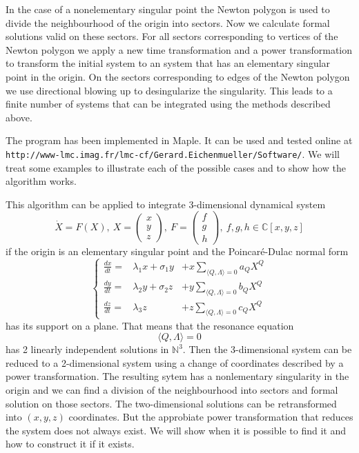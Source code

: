 \documentclass[11p,a4paper]{article}
\newcommand{\N}{{\mathbb N}}
\newcommand{\C}{{\mathbb C}}
\begin{document}
In the case of a nonelementary singular point the Newton polygon is used to
divide the neighbourhood of the origin into sectors. Now we calculate formal
solutions valid on these sectors. For all sectors corresponding to 
vertices of the Newton polygon we apply a new time transformation and a 
power transformation to transform the initial system to an system that 
has an elementary singular point in the origin. On the sectors 
corresponding to edges of the Newton polygon we use 
directional blowing up to desingularize the singularity. This  
leads to a finite number of systems that can be integrated using the 
methods described above. 

The program has been implemented in Maple. It can be used and tested online at
{\tt http://www-lmc.imag.fr/lmc-cf/Gerard.Eichenmueller/Software/}. 
We will treat some examples to illustrate each of the possible cases and 
to show how the algorithm works.

This algorithm can be applied to integrate 3-dimensional dynamical 
system 
\[
\dot X = F(X),\ X=\left( \begin{array}{c}x\\y\\z \end{array} \right),\ 
F=\left( \begin{array}{c}f\\g\\h \end{array} \right),\ f,g,h \in \C[x,y,z]
\]
if the origin is an elementary singular point and the 
Poincar\'e-Dulac normal form 
\[
\left\{ \begin{array}{lrl}\frac{dx}{dt}= & \lambda_1 x + \sigma_1 y & 
+ x \sum_{\langle Q,\Lambda \rangle=0} a_Q X^Q\\
\frac{dy}{dt}= & \lambda_2 y + \sigma_2 z & + y 
\sum_{\langle Q,\Lambda \rangle=0} b_Q X^Q \\
\frac{dz}{dt}= & \lambda_3 z & + z \sum_{\langle Q,\Lambda \rangle=0} 
c_Q X^Q 
\end{array}\right.
\]
has its support on a plane. That means that the resonance equation 
\[
\langle Q, \Lambda \rangle = 0
\]
has 2 linearly independent solutions in $\N^3$. Then the 
3-dimensional system can be reduced to a 2-dimensional system using 
a change of coordinates 
described by a power transformation. The resulting sytem has a nonlementary 
singularity in 
the origin and we can find a division of the neighbourhood into sectors 
and formal solution on those sectors. The two-dimensional solutions 
can be retransformed into $(x,y,z)$ coordinates. But the approbiate 
power transformation that reduces the system does not always exist. 
We will show when it is possible to find it
and how to construct it if it exists.
\end{document}
